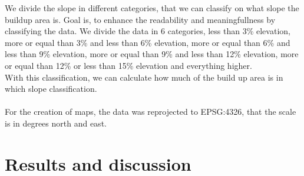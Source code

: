 \documentclass[10pt, twocolumn, twoside]{article}
\begin{document}
We divide the slope in different categories, that we can classify on what slope the buildup area is. Goal is, to enhance the readability and meaningfullness by classifying the data. We divide the data in 6 categories, less than 3\% elevation, more or equal than 3\% and less than 6\% elevation, more or equal than 6\% and less than 9\% elevation, more or equal than 9\% and less than 12\% elevation, more or equal than 12\% or less than 15\% elevation and everything higher.\\
With this classification, we can calculate how much of the build up area is in which slope classification. \\\\
For the creation of maps, the data was reprojected to EPSG:4326, that the scale is in degrees north and east.

\begin{table}[t]
\caption{Build Up Area}
\label{tab:perc_buildup}
\end{table}

\section{Results and discussion}\label{sec3}
\end{document}
